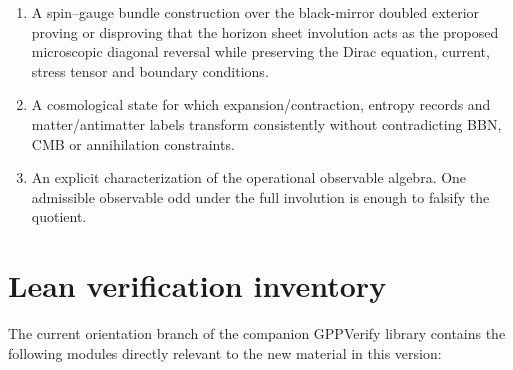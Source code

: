 \documentclass[11pt]{article}
\theoremstyle{definition}\newtheorem{definition}[theorem]{Definition}
\theoremstyle{remark}\newtheorem{remark}[theorem]{Remark}\newtheorem{conjecture}[theorem]{Conjecture}
\begin{document}
\begin{enumerate}[label=(F\arabic*)]
\item A spin--gauge bundle construction over the black-mirror doubled exterior proving or disproving that the horizon sheet involution acts as the proposed microscopic diagonal reversal while preserving the Dirac equation, current, stress tensor and boundary conditions.
\item A cosmological state for which expansion/contraction, entropy records and matter/antimatter labels transform consistently without contradicting BBN, CMB or annihilation constraints.
\item An explicit characterization of the operational observable algebra. One admissible observable odd under the full involution is enough to falsify the quotient.
\end{enumerate}

\section{Lean verification inventory}\label{app:leaninventory}
The current orientation branch of the companion GPPVerify library contains the following modules directly relevant to the new material in this version:
\end{document}
